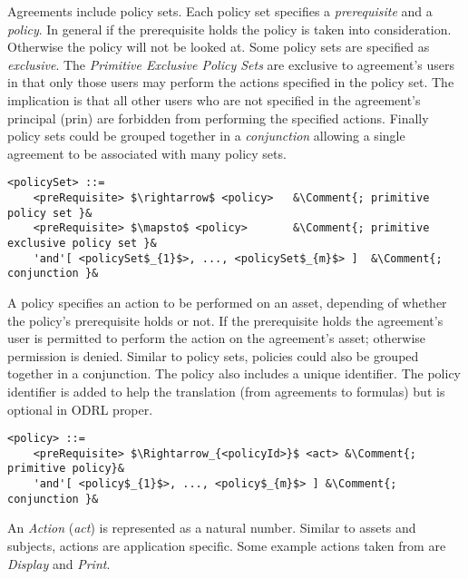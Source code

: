 Agreements include policy sets. Each policy set specifies a \emph{prerequisite} and a \emph{policy}. In general if the prerequisite holds the policy is taken into consideration. Otherwise the policy will not be looked at. Some policy sets are specified as \emph{exclusive}. The \emph{Primitive Exclusive Policy Sets} are exclusive to agreement's users in that only those users may perform the actions specified in the policy set. The implication is that all other users who are not specified in the agreement's principal (prin) are forbidden from performing the specified actions. Finally policy sets could be grouped together in a \emph{conjunction} allowing a single agreement to be associated with many policy sets. 


\newcommand*{\Comment}[1]{\hfill\makebox[7.0cm][l]{#1}}%
\lstset{mathescape, language=AST, escapechar=\&}  
\begin{lstlisting}[frame=single, caption={policySet},label={lst:policySetast}]
<policySet> ::=  
	<preRequisite> $\rightarrow$ <policy>	&\Comment{; primitive policy set }&
	<preRequisite> $\mapsto$ <policy>		&\Comment{; primitive exclusive policy set }&
	'and'[ <policySet$_{1}$>, ..., <policySet$_{m}$> ]	&\Comment{; conjunction }&
\end{lstlisting}

A policy specifies an action to be performed on an asset, depending of whether the policy's prerequisite holds or not. If the prerequisite holds the agreement's user is permitted to perform the action on the agreement's asset; otherwise permission is denied. Similar to policy sets, policies could also be grouped together in a conjunction. The policy also includes a unique identifier. The policy identifier is added to help the translation (from agreements to formulas) but is optional in ODRL proper.


\lstset{mathescape, language=AST, escapechar=\&}  
\begin{lstlisting}[frame=single, caption={policy},label={lst:policyast}]
<policy> ::=  
	<preRequisite> $\Rightarrow_{<policyId>}$ <act> &\Comment{; primitive policy}&
	'and'[ <policy$_{1}$>, ..., <policy$_{m}$> ] &\Comment{; conjunction }&
\end{lstlisting}

An \emph{Action} (\emph{act}) is represented as a natural number. Similar to assets and subjects, actions are application specific. Some example actions taken from \cite{pucella2006} are \emph{Display} and \emph{Print}.

